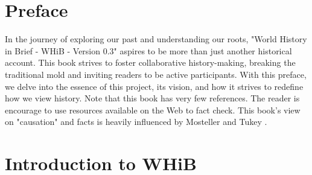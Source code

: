 \documentclass[a4paper,12pt]{book}
\begin{document}
\begin{titlepage}
\end{titlepage}


\tableofcontents
\cleardoublepage

\chapter*{Preface}
In the journey of exploring our past and understanding our roots, "World History in Brief - WHiB - Version 0.3" aspires to be more than just another historical account. This book strives to foster collaborative history-making, breaking the traditional mold and inviting readers to be active participants. With this preface, we delve into the essence of this project, its vision, and how it strives to redefine how we view history. Note that this book has very few references. The reader is encourage to use resources available on the Web to fact check. This book's view on "causation" and facts is heavily influenced by Mosteller and Tukey \cite{mosteller1977}.

\chapter{Introduction to WHiB}
\end{document}

